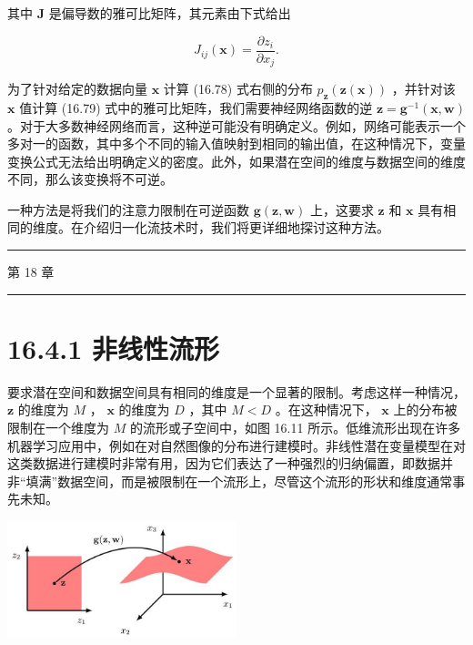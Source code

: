 \documentclass[10pt]{report}
\newcommand{\HRule}{\begin{center}\rule{0.9\linewidth}{0.2mm}\end{center}}
\begin{document}
其中 \(\mathbf{J}\) 是偏导数的雅可比矩阵，其元素由下式给出

\[
{J}_{ij}\left( \mathbf{x}\right)  = \frac{\partial {z}_{i}}{\partial {x}_{j}}. \tag{16.79}
\]

为了针对给定的数据向量 \(\mathbf{x}\) 计算 (16.78) 式右侧的分布 \({p}_{\mathbf{z}}\left( {\mathbf{z}\left( \mathbf{x}\right) }\right)\) ，并针对该 \(\mathbf{x}\) 值计算 (16.79) 式中的雅可比矩阵，我们需要神经网络函数的逆 \(\mathbf{z} = {\mathbf{g}}^{-1}\left( {\mathbf{x},\mathbf{w}}\right)\) 。对于大多数神经网络而言，这种逆可能没有明确定义。例如，网络可能表示一个多对一的函数，其中多个不同的输入值映射到相同的输出值，在这种情况下，变量变换公式无法给出明确定义的密度。此外，如果潜在空间的维度与数据空间的维度不同，那么该变换将不可逆。

一种方法是将我们的注意力限制在可逆函数 \(\mathbf{g}\left( {\mathbf{z},\mathbf{w}}\right)\) 上，这要求 \(\mathbf{z}\) 和 \(\mathbf{x}\) 具有相同的维度。在介绍归一化流技术时，我们将更详细地探讨这种方法。

\HRule

第 18 章

\HRule

\section*{16.4.1 非线性流形}

要求潜在空间和数据空间具有相同的维度是一个显著的限制。考虑这样一种情况， \(\mathbf{z}\) 的维度为 \(M\) ， \(\mathbf{x}\) 的维度为 \(D\) ，其中 \(M < D\) 。在这种情况下， \(\mathbf{x}\) 上的分布被限制在一个维度为 \(M\) 的流形或子空间中，如图 16.11 所示。低维流形出现在许多机器学习应用中，例如在对自然图像的分布进行建模时。非线性潜在变量模型在对这类数据进行建模时非常有用，因为它们表达了一种强烈的归纳偏置，即数据并非“填满”数据空间，而是被限制在一个流形上，尽管这个流形的形状和维度通常事先未知。

\begin{center}
\includegraphics[max width=0.5\textwidth]{images/0194e279-9b28-703a-88f4-c3ac21e2010d_542_876_352_669_340_0.jpg}
\end{center}
\hspace*{3em} 
\end{document}
